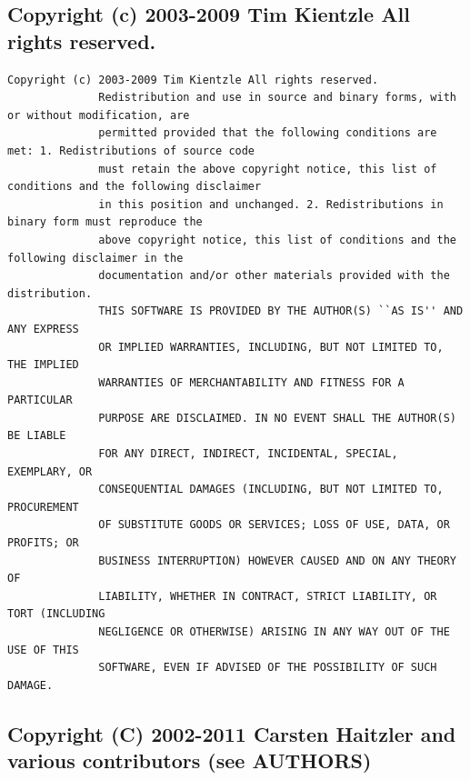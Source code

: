 \subsection{Copyright (c) 2003-2009 Tim Kientzle All rights reserved.}

\begin{lstlisting}[basicstyle=\ttfamily\scriptsize,breaklines=true]
Copyright (c) 2003-2009 Tim Kientzle All rights reserved.
              Redistribution and use in source and binary forms, with or without modification, are
              permitted provided that the following conditions are met: 1. Redistributions of source code
              must retain the above copyright notice, this list of conditions and the following disclaimer
              in this position and unchanged. 2. Redistributions in binary form must reproduce the
              above copyright notice, this list of conditions and the following disclaimer in the
              documentation and/or other materials provided with the distribution.
              THIS SOFTWARE IS PROVIDED BY THE AUTHOR(S) ``AS IS'' AND ANY EXPRESS
              OR IMPLIED WARRANTIES, INCLUDING, BUT NOT LIMITED TO, THE IMPLIED
              WARRANTIES OF MERCHANTABILITY AND FITNESS FOR A PARTICULAR
              PURPOSE ARE DISCLAIMED. IN NO EVENT SHALL THE AUTHOR(S) BE LIABLE
              FOR ANY DIRECT, INDIRECT, INCIDENTAL, SPECIAL, EXEMPLARY, OR
              CONSEQUENTIAL DAMAGES (INCLUDING, BUT NOT LIMITED TO, PROCUREMENT
              OF SUBSTITUTE GOODS OR SERVICES; LOSS OF USE, DATA, OR PROFITS; OR
              BUSINESS INTERRUPTION) HOWEVER CAUSED AND ON ANY THEORY OF
              LIABILITY, WHETHER IN CONTRACT, STRICT LIABILITY, OR TORT (INCLUDING
              NEGLIGENCE OR OTHERWISE) ARISING IN ANY WAY OUT OF THE USE OF THIS
              SOFTWARE, EVEN IF ADVISED OF THE POSSIBILITY OF SUCH DAMAGE.
\end{lstlisting}

\subsection{Copyright (C) 2002-2011 Carsten Haitzler and various contributors (see AUTHORS)}

